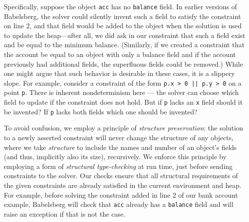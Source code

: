 \documentclass[10pt,reprint]{sigplanconf-preprint}
\def\ab#1{\todo[size=\footnotesize,color=red!40]{\textsf{AB: #1}}}
\begin{document}
Specifically, suppose the object \verb!acc! has no \verb!balance!
field.  In earlier versions of Babelsberg, the solver could silently
invent such a field to satisfy the constraint on line 2, and that field
would be added to the object when the solution is used to update the
heap---after all, we did ask in our constraint that such a field exist
and be equal to the minimum balance. (Similarly, if we created a
constraint that the account be equal to an object with only a balance
field and if the account previously had additional fields, the superfluous
fields could be removed.) 
While one might argue that such behavior is desirable in these
cases, it is a slippery slope.  For example, consider a constraint of
the form \verb!p.x > 0 || p.y > 0!  on a point \verb!p!.  There is
inherent nondeterminism here --- the solver can choose which field to
update if the constraint does not hold.  But if \verb!p! lacks an
\verb!x!  field should it be invented?  If \verb!p! lacks both fields
which one should be invented?

To avoid confusion, we employ a principle of \emph{structure
  preservation}: the solution to a newly asserted constraint will never
change the structure of any objects, where we take \emph{structure} to
include the names and number of an object's fields (and thus,
implicitly also its size), recursively.
We enforce this principle by employing a form of \emph{structural
  type-checking} at run time, just before sending constraints to the
solver. Our checks ensure that all structural requirements of the
given constraints are already satisfied in the current environment and
heap.  For example, before solving the constraint added in line 2 of our
bank account example, Babelsberg will check that \verb!acc! already
has a \verb!balance! field and will raise an exception if that is not
the case.  

\end{document}
